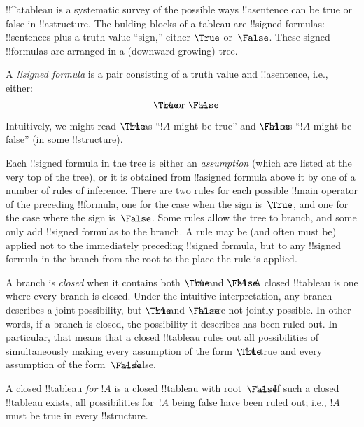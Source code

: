 \documentclass[../../../include/open-logic-section]{subfiles}
\begin{document}


!!^a{tableau} is a systematic survey of the possible ways
!!a{sentence} can be true or false in !!a{structure}. The bulding
blocks of a tableau are !!{signed formula}s: !!{sentence}s plus a
truth value ``sign,'' either $\True$ or~$\False$. These signed
!!{formula}s are arranged in a (downward growing) tree.

\begin{defn}
  A \emph{!!{signed formula}} is a pair consisting of a truth value
  and !!a{sentence}, i.e., either:
  \[
  \sFmla{\True}{!A} \text{ or } \sFmla{\False}{!A}.
  \]
\end{defn}

Intuitively, we might read $\sFmla{\True}{!A}$ as ``$!A$ might be
true'' and $\sFmla{\False}{!A}$ as ``$!A$ might be false'' (in some
!!{structure}).

Each !!{signed formula} in the tree is either an \emph{assumption}
(which are listed at the very top of the tree), or it is obtained from
!!a{signed formula} above it by one of a number of rules of
inference. There are two rules for each possible !!{main operator} of
the preceding !!{formula}, one for the case when the sign is~$\True$,
and one for the case where the sign is~$\False$. Some rules allow the
tree to branch, and some only add !!{signed formula}s to the branch.
A rule may be (and often must be) applied not to the immediately
preceding !!{signed formula}, but to any !!{signed formula} in the
branch from the root to the place the rule is applied.

A branch is \emph{closed} when it contains both $\sFmla{\True}{!A}$
and $\sFmla{\False}{!A}$. A closed !!{tableau} is one where every branch
is closed.  Under the intuitive interpretation, any branch describes a
joint possibility, but $\sFmla{\True}{!A}$ and $\sFmla{\False}{!A}$
are not jointly possible. In other words, if a branch is closed, the
possibility it describes has been ruled out. In particular, that means
that a closed !!{tableau} rules out all possibilities of simultaneously
making every assumption of the form $\sFmla{\True}{!A}$ true and every
assumption of the form~$\sFmla{\False}{!A}$ false.

A closed !!{tableau} \emph{for $!A$} is a closed !!{tableau} with
root~$\sFmla{\False}{!A}$. If such a closed !!{tableau} exists, all
possibilities for~$!A$ being false have been ruled out; i.e., $!A$
must be true in every !!{structure}.
\end{document}
